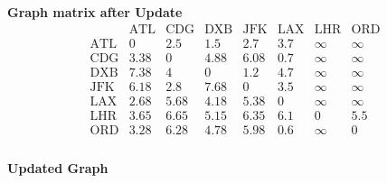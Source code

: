 \documentclass[conference]{IEEEtran}
\begin{document}
\textbf{Graph matrix after Update}
\[
\begin{array}{c|ccccccc}
     & \text{ATL} & \text{CDG} & \text{DXB} & \text{JFK} & \text{LAX} & \text{LHR} & \text{ORD} \\
\hline
\text{ATL} & 0 & 2.5 & 1.5 & 2.7 & 3.7 & \infty & \infty \\
\text{CDG} & 3.38 & 0 & 4.88 & 6.08 & 0.7 & \infty & \infty \\
\text{DXB} & 7.38 & 4 & 0 & 1.2 & 4.7 & \infty  & \infty \\
\text{JFK} & 6.18 & 2.8 & 7.68 & 0 & 3.5 & \infty & \infty \\
\text{LAX} & 2.68 & 5.68 & 4.18 & 5.38 & 0 & \infty & \infty \\
\text{LHR} & 3.65 & 6.65 & 5.15 & 6.35 & 6.1 & 0 & 5.5 \\
\text{ORD} & 3.28 & 6.28 & 4.78 & 5.98 & 0.6 & \infty & 0 \\
\end{array}
\]
\newline
\\
\textbf{Updated Graph}
\\
\end{document}
